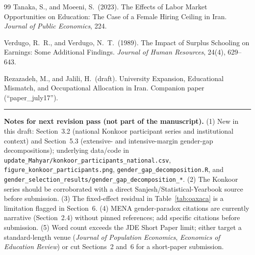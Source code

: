 \documentclass[11pt]{article}
\begin{document}
\begin{thebibliography}{99}
Tanaka, S., and Moeeni, S.\ (2023). The Effects of Labor Market Opportunities on Education: The Case of a Female Hiring Ceiling in Iran. \emph{Journal of Public Economics}, 224.

Verdugo, R.\ R., and Verdugo, N.\ T.\ (1989). The Impact of Surplus Schooling on Earnings: Some Additional Findings. \emph{Journal of Human Resources}, 24(4), 629--643.

Rezazadeh, M., and Jalili, H.\ (draft). University Expansion, Educational Mismatch, and Occupational Allocation in Iran. Companion paper (``paper\_july17'').

\end{thebibliography}

\vspace{12pt}
\noindent\rule{\textwidth}{0.4pt}
\vspace{4pt}

\noindent\textbf{Notes for next revision pass (not part of the manuscript).} (1) New in this draft: Section~3.2 (national Konkoor participant series and institutional context) and Section~5.3 (extensive- and intensive-margin gender-gap decompositions); underlying data/code in \texttt{update\_Mahyar/konkoor\_participants\_national.csv}, \texttt{figure\_konkoor\_participants.png}, \texttt{gender\_gap\_decomposition.R}, and \texttt{gender\_selection\_results/gender\_gap\_decomposition\_*}. (2) The Konkoor series should be corroborated with a direct Sanjesh/Statistical-Yearbook source before submission. (3) The fixed-effect residual in Table~\ref{tab:oaxaca} is a limitation flagged in Section~6. (4) MENA gender-paradox citations are currently narrative (Section~2.4) without pinned references; add specific citations before submission. (5) Word count exceeds the JDE Short Paper limit; either target a standard-length venue (\emph{Journal of Population Economics}, \emph{Economics of Education Review}) or cut Sections~2 and~6 for a short-paper submission.
\end{document}
